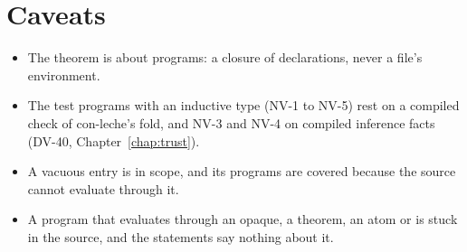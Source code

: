 \section*{Caveats}
\begin{itemize}
\item The theorem is about programs: a closure of declarations, never a file's environment.
\item The test programs with an inductive type (NV-1 to NV-5) rest on a compiled check of con-leche's fold, and NV-3 and NV-4 on compiled inference facts (DV-40, Chapter~\ref{chap:trust}).
\item A vacuous entry is in scope, and its programs are covered because the source cannot evaluate
  through it.
\item A program that evaluates through an opaque, a theorem, an  atom or
   is stuck in the source, and the statements say nothing about it.
\end{itemize}
